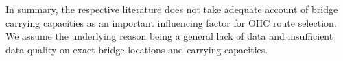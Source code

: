 \par
In summary, the respective literature does not take adequate account of bridge carrying capacities as an important influencing factor for OHC route selection. We assume the underlying reason being a general lack of data and insufficient data quality on exact bridge locations and carrying capacities.



%
%
%
%

